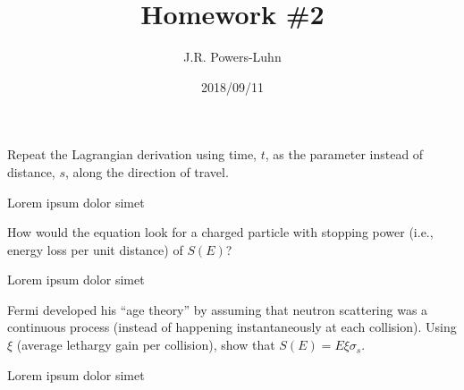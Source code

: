 \documentclass{hw}
\author{J.R. Powers-Luhn}
\date{2018/09/11}
\title{Homework \#2}
\begin{document}
\problem{}
    Repeat the Lagrangian derivation using time, $t$, as the parameter instead of distance, $s$, along the direction of travel.

\solution
    Lorem ipsum dolor simet

\problem{}
    How would the equation look for a charged particle with stopping power (i.e., energy loss per unit distance) of $S(E)$?

\solution
    Lorem ipsum dolor simet

\problem{}
    Fermi developed his “age theory” by assuming that neutron scattering was a continuous process (instead of happening instantaneously at each collision). Using $\xi$ (average lethargy gain per collision), show that $S(E)=E \xi \sigma_s$.

\solution
    Lorem ipsum dolor simet
\end{document}
